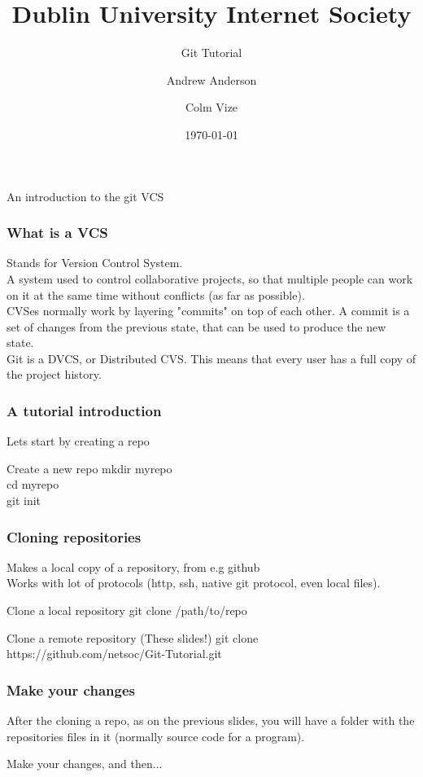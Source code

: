 \documentclass[xcolor=dvipsnames]{beamer}
\begin{document}
\title[Netsoc Git Tutorial] {Dublin University Internet Society}
\author[A. Anderson \& C. Vize]{Andrew Anderson  \and Colm Vize }
\subtitle{Git Tutorial}{An introduction to the git VCS}
\date{\today}
\titlepage

\begin{frame}
	\frametitle{What is a VCS}
	
	Stands for Version Control System.\\
	A system used to control collaborative projects, so that multiple people can work on it at the same
	time without conflicts (as far as possible).\\
	CVSes normally work by layering "commits" on top of each other. A commit is a set of changes from the previous state,
	that can be used to produce the new state.\\
	Git is a DVCS, or Distributed CVS. This means that every user has a full copy of the project history.\\
\end{frame}

\begin{frame}
	\frametitle{A tutorial introduction}

	Lets start by creating a repo
	\begin{block}{Create a new repo}
		mkdir myrepo\\
		cd myrepo\\
		git init
	\end{block}
\end{frame}

\begin{frame}
	\frametitle{Cloning repositories}
	Makes a local copy of a repository, from e.g github\\
	Works with lot of protocols (http, ssh, native git protocol, even local files).

	\begin{block}{Clone a local repository}
		git clone /path/to/repo
	\end{block}
	\begin{block}{Clone a remote repository (These slides!)}
		git clone https://github.com/netsoc/Git-Tutorial.git
	\end{block}
\end{frame}

\begin{frame}
	\frametitle{Make your changes}
	After the cloning a repo, as on the previous slides, you will have a folder with the repositories
	files in it (normally source code for a program).

	Make your changes, and then...
\end{frame}
\end{document}
